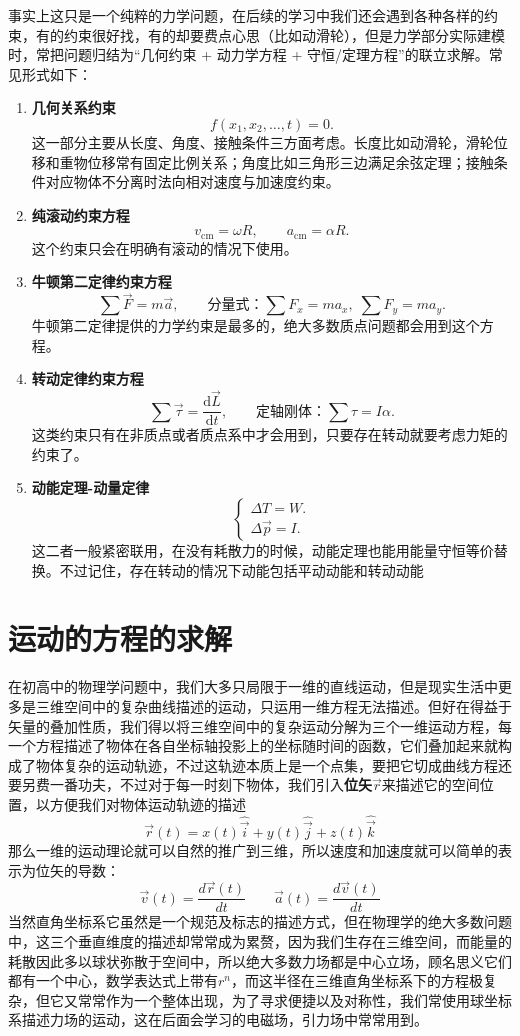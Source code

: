 \documentclass[UTF8]{ctexbook}
\begin{document}
事实上这只是一个纯粹的力学问题，在后续的学习中我们还会遇到各种各样的约束，有的约束很好找，有的却要费点心思（比如动滑轮），但是力学部分实际建模时，常把问题归结为“几何约束 + 动力学方程 + 守恒/定理方程”的联立求解。常见形式如下：

\begin{enumerate}
\item \textbf{几何关系约束}
\[
f(x_1,x_2,\dots,t)=0.
\]
这一部分主要从长度、角度、接触条件三方面考虑。长度比如动滑轮，滑轮位移和重物位移常有固定比例关系；角度比如三角形三边满足余弦定理；接触条件对应物体不分离时法向相对速度与加速度约束。

\item \textbf{纯滚动约束方程}
\[
v_{\mathrm{cm}}=\omega R,
\qquad
a_{\mathrm{cm}}=\alpha R.
\]
这个约束只会在明确有滚动的情况下使用。

\item \textbf{牛顿第二定律约束方程}
\[
\sum \vec{F}=m\vec{a},
\qquad
\text{分量式：}\sum F_x=ma_x,\;\sum F_y=ma_y.
\]
牛顿第二定律提供的力学约束是最多的，绝大多数质点问题都会用到这个方程。
\item \textbf{转动定律约束方程}
\[
\sum \vec{\tau}=\frac{\mathrm d\vec{L}}{\mathrm dt},
\qquad
\text{定轴刚体：}\sum \tau=I\alpha.
\]
这类约束只有在非质点或者质点系中才会用到，只要存在转动就要考虑力矩的约束了。
\item \textbf{动能定理-动量定律}
\[
\begin{cases}
\Delta T=W.    \\
\Delta \vec{p}=I.
\end{cases}
\]
这二者一般紧密联用，在没有耗散力的时候，动能定理也能用能量守恒等价替换。不过记住，存在转动的情况下动能包括平动动能和转动动能

\end{enumerate}

\newpage

\section{运动的方程的求解}

在初高中的物理学问题中，我们大多只局限于一维的直线运动，但是现实生活中更多是三维空间中的复杂曲线描述的运动，只运用一维方程无法描述。但好在得益于矢量的叠加性质，我们得以将三维空间中的复杂运动分解为三个一维运动方程，每一个方程描述了物体在各自坐标轴投影上的坐标随时间的函数，它们叠加起来就构成了物体复杂的运动轨迹，不过这轨迹本质上是一个点集，要把它切成曲线方程还要另费一番功夫，不过对于每一时刻下物体，我们引入\textbf{位矢$\vec{r} $}来描述它的空间位置，以方便我们对物体运动轨迹的描述
\[
\vec{r}(t)=x(t)\hat{\vec{i}}+y(t)\hat{\vec{j}}+z(t)\hat{\vec{k}}
\]
那么一维的运动理论就可以自然的推广到三维，所以速度和加速度就可以简单的表示为位矢的导数：
\[
\vec{v}(t)  =\frac{d\vec{r}(t)}{dt}
\qquad
\vec{a}(t)  =\frac{d\vec{v}(t)}{dt}
\]
当然直角坐标系它虽然是一个规范及标志的描述方式，但在物理学的绝大多数问题中，这三个垂直维度的描述却常常成为累赘，因为我们生存在三维空间，而能量的耗散因此多以球状弥散于空间中，所以绝大多数力场都是中心立场，顾名思义它们都有一个中心，数学表达式上带有$r^n$，而这半径在三维直角坐标系下的方程极复杂，但它又常常作为一个整体出现，为了寻求便捷以及对称性，我们常使用球坐标系描述力场的运动，这在后面会学习的电磁场，引力场中常常用到。
\end{document}
